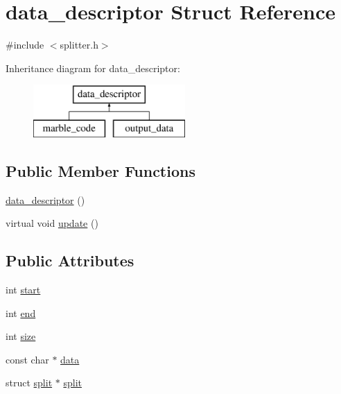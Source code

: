 \hypertarget{structdata__descriptor}{}\section{data\+\_\+descriptor Struct Reference}
\label{structdata__descriptor}


{\ttfamily \#include $<$splitter.\+h$>$}

Inheritance diagram for data\+\_\+descriptor\+:\begin{figure}[H]
\begin{center}
\leavevmode
\includegraphics[height=2.000000cm]{structdata__descriptor}
\end{center}
\end{figure}
\subsection*{Public Member Functions}
\begin{DoxyCompactItemize}
\item 
\hyperlink{structdata__descriptor_a6d9ca56cc8c9dc991da573b4de28a24f}{data\+\_\+descriptor} ()
\item 
virtual void \hyperlink{structdata__descriptor_ad6cd92beb7d2b9291e0d130a24faa380}{update} ()
\end{DoxyCompactItemize}
\subsection*{Public Attributes}
\begin{DoxyCompactItemize}
\item 
int \hyperlink{structdata__descriptor_a4a00d6d056ecfcfe90fbcd3df6687e40}{start}
\item 
int \hyperlink{structdata__descriptor_a13601b4b047a84f9ae3b039e1ac7b32f}{end}
\item 
int \hyperlink{structdata__descriptor_a8020a1ab93f8785b3c291794ff9fe072}{size}
\item 
const char $\ast$ \hyperlink{structdata__descriptor_a438b90d9b79eaa4d589d13edc66809cb}{data}
\item 
struct \hyperlink{structsplit}{split} $\ast$ \hyperlink{structdata__descriptor_aae971f7bfb2cd98392b69af23c2245b2}{split}
\end{DoxyCompactItemize}


